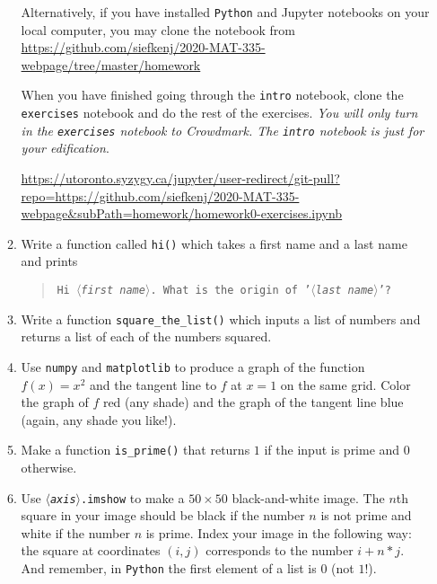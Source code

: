 \documentclass[letter]{article}
\newcommand{\var}[1]{{$\langle$\it #1$\rangle$}}
\begin{document}
\begin{enumerate}
\begin{enumerate}
				Alternatively, if you have installed {\tt Python} and Jupyter notebooks on your local computer, you may
				clone the notebook from \url{https://github.com/siefkenj/2020-MAT-335-webpage/tree/master/homework}

				When you have finished going through the {\tt intro} notebook, clone the {\tt exercises} notebook
				and do the rest of the exercises. \emph{You will only turn in the {\tt exercises} notebook to Crowdmark.
				The {\tt intro} notebook is just for your edification}.
				
				\url{https://utoronto.syzygy.ca/jupyter/user-redirect/git-pull?repo=https://github.com/siefkenj/2020-MAT-335-webpage&subPath=homework/homework0-exercises.ipynb}
			\item Write a function called {\tt hi()} which takes a first name and a last name and prints 
				\begin{quote}{\tt Hi \var{first name}. What is the origin of '\var{last name}'?}\end{quote}
			\item Write a function \verb|square_the_list()| which inputs a list of numbers and returns
				a list of each of the numbers squared.
			\item Use {\tt numpy} and {\tt matplotlib} to produce a graph of the function $f(x)=x^2$ and the tangent
				line to $f$ at $x=1$ on the same grid. Color the graph of $f$ red (any shade) and the graph of the
				tangent line blue (again, any shade you like!). 
			\item Make a function \verb|is_prime()| that returns $1$ if the input is prime and $0$ otherwise.
			\item Use {\tt \var{axis}.imshow} to make a $50\times 50$ black-and-white image. The $n$th square in your
				image should be black if the number $n$ is not prime and white if the number $n$ is prime. Index your image
				in the following way: the square at coordinates $(i,j)$ corresponds to the number $i+n*j$. 
				And remember, in {\tt Python} the first element of a list is $0$ (not $1$!).
		\end{enumerate}
	\end{enumerate}
\end{document}
